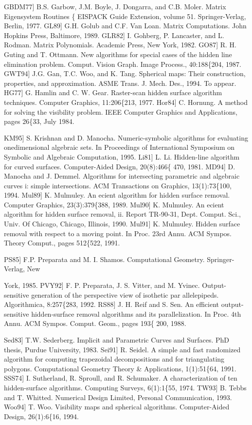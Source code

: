 \documentclass[11pt,letterpaper]{article}
\newcommand{\ReferenceParagraph}[1]{\par{\fontsize{10.5}{12}\selectfont #1\par}}
\begin{document}
\ReferenceParagraph{GBDM77] B.S. Garbow, J.M. Boyle, J. Dongarra, and C.B. Moler. Matrix Eigensystem Routines \{ EISPACK Guide Extension, volume 51. Springer-Verlag, Berlin, 1977. GL89] G.H. Golub and C.F. Van Loan. Matrix Computations. John Hopkins Press, Baltimore, 1989. GLR82] I. Gohberg, P. Lancaster, and L. Rodman. Matrix Polynomials. Academic Press, New York, 1982. GO87] R. H. Guting and T. Ottmann. New algorithms for special cases of the hidden line elimination problem. Comput. Vision Graph. Image Process., 40:188\{204, 1987. GWT94] J.G. Gan, T.C. Woo, and K. Tang. Spherical maps: Their construction, properties, and approximation. ASME Trans. J. Mech. Des., 1994. To appear. HG77] G. Hamlin and C. W. Gear. Raster-scan hidden surface algorithm techniques. Computer Graphics, 11:206\{213, 1977. Hor84] C. Hornung. A method for solving the visibility problem. IEEE Computer Graphics and Applications, pages 26\{33, July 1984.}
\ReferenceParagraph{KM95] S. Krishnan and D. Manocha. Numeric-symbolic algorithms for evaluating onedimensional algebraic sets. In Proceedings of International Symposium on Symbolic and Algebraic Computation, 1995. Li81] L. Li. Hidden-line algorithm for curved surfaces. Computer-Aided Design, 20(8):466\{ 470, 1981. MD94] D. Manocha and J. Demmel. Algorithms for intersecting parametric and algebraic curves i: simple intersections. ACM Transactions on Graphics, 13(1):73\{100, 1994. Mul89] K. Mulmuley. An ecient algorithm for hidden surface removal. Computer Graphics, 23(3):379\{388, 1989. Mul90] K. Mulmuley. An ecient algorithm for hidden surface removal, ii. Report TR-90-31, Dept. Comput. Sci., Univ. Of Chicago, Chicago, Illinois, 1990. Mul91] K. Mulmuley. Hidden surface removal with respect to a moving point. In Proc. 23rd Annu. ACM Sympos. Theory Comput., pages 512\{522, 1991.}
\ReferenceParagraph{PS85] F.P. Preparata and M. I. Shamos. Computational Geometry. Springer-Verlag, New}
York, 1985. PVY92] F. P. Preparata, J. S. Vitter, and M. Yvinec. Output-sensitive generation of the perspective view of isothetic par allelepipeds. Algorithmica, 8:257\{283, 1992. RS88] J. H. Reif and S. Sen. An efficient output-sensitive hidden-surface removal algorithms and its parallelization. In Proc. 4th Annu. ACM Sympos. Comput. Geom., pages 193\{ 200, 1988.

Sed83] T.W. Sederberg. Implicit and Parametric Curves and Surfaces. PhD thesis, Purdue University, 1983. Sei91] R. Seidel. A simple and fast randomized algorithm for computing trapezoidal decompositions and for triangulating polygons. Computational Geometry Theory \& Applications, 1(1):51\{64, 1991. SSS74] I. Sutherland, R. Sproull, and R. Schumaker. A characterization of ten hidden-surface algorithms. Computing Surveys, 6(1):1\{55, 1974. TW93] B. Tebbs and T. Whitted. Numerical Design Limited, Personal Communication, 1993. Woo94] T. Woo. Visibility maps and spherical algorithms. Computer-Aided Design, 26(1):6\{16, 1994.
\end{document}
